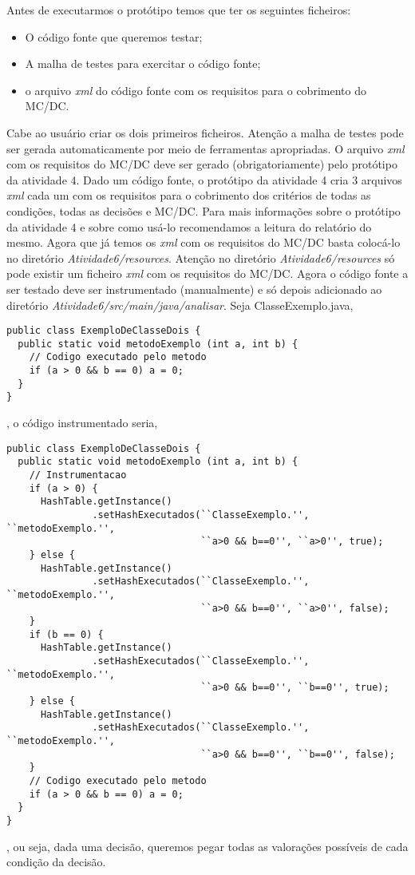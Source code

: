 \documentclass[a4paper,11pt]{article}
\begin{document}
\begin{itemize}
Antes de executarmos o protótipo temos que ter os seguintes ficheiros:
\begin{itemize}
\item O código fonte que queremos testar;
\item A malha de testes para exercitar o código fonte;
\item o arquivo \textit{xml} do código fonte com os requisitos para o cobrimento do MC/DC.
\end{itemize}
Cabe ao usuário criar os dois primeiros ficheiros. Atenção a malha de testes pode ser gerada automaticamente por 
meio de ferramentas apropriadas.
O arquivo \textit{xml} com os requisitos do MC/DC deve ser gerado (obrigatoriamente) pelo protótipo da atividade 4. 
Dado um código fonte, o protótipo da atividade 4 cria 3 arquivos \textit{xml} cada um com os requisitos para o cobrimento 
dos critérios de todas as condições, todas as decisões e MC/DC. Para mais informações sobre o protótipo da atividade 4
e sobre como usá-lo recomendamos a leitura do relatório do mesmo. Agora que já temos os \textit{xml} com os requisitos do MC/DC
basta colocá-lo no diretório \textit{Atividade6/resources}. Atenção no diretório \textit{Atividade6/resources} só pode existir 
um ficheiro \textit{xml} com os requisitos do MC/DC.
Agora o código fonte a ser testado deve ser instrumentado (manualmente) e só depois adicionado ao diretório \textit{Atividade6/src/main/java/analisar}. 
Seja ClasseExemplo.java,
\begin{lstlisting}
public class ExemploDeClasseDois {
  public static void metodoExemplo (int a, int b) {
    // Codigo executado pelo metodo
    if (a > 0 && b == 0) a = 0;
  }
}
\end{lstlisting}
, o código instrumentado seria,
\begin{lstlisting}
public class ExemploDeClasseDois {
  public static void metodoExemplo (int a, int b) {
    // Instrumentacao
    if (a > 0) {
      HashTable.getInstance()
               .setHashExecutados(``ClasseExemplo.'', ``metodoExemplo.'', 
                                  ``a>0 && b==0'', ``a>0'', true);
    } else {
      HashTable.getInstance()
               .setHashExecutados(``ClasseExemplo.'', ``metodoExemplo.'', 
                                  ``a>0 && b==0'', ``a>0'', false);
    }
    if (b == 0) {
      HashTable.getInstance()
               .setHashExecutados(``ClasseExemplo.'', ``metodoExemplo.'', 
                                  ``a>0 && b==0'', ``b==0'', true);
    } else {
      HashTable.getInstance()
               .setHashExecutados(``ClasseExemplo.'', ``metodoExemplo.'', 
                                  ``a>0 && b==0'', ``b==0'', false);
    }
    // Codigo executado pelo metodo
    if (a > 0 && b == 0) a = 0;    
  }
}
\end{lstlisting}
, ou seja, dada uma decisão, queremos pegar todas as valorações possíveis de cada condição da decisão.


\end{itemize}
\end{document}
